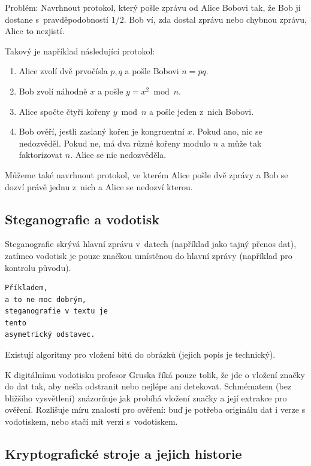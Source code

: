 Problém: Navrhnout protokol, který pošle zprávu od Alice Bobovi tak, že
Bob ji dostane s~pravděpodobností $1/2$. Bob ví, zda dostal zprávu nebo
chybnou zprávu, Alice to nezjistí.

Takový je například následující protokol:
\begin{enumerate}
    \item Alice zvolí dvě prvočísla $p,q$ a pošle Bobovi $n = pq$.
    \item Bob zvolí náhodně $x$ a pošle $y = x^2 \bmod n$.
    \item Alice spočte čtyři kořeny $y \bmod n$ a pošle jeden z~nich
        Bobovi.
    \item Bob ověří, jestli zaslaný kořen je kongruentní $x$. Pokud ano,
        nic se nedozvěděl. Pokud ne, má dva různé kořeny modulo $n$ a
        může tak faktorizovat $n$. Alice se nic nedozvěděla.
\end{enumerate}

Můžeme také navrhnout protokol, ve kterém Alice pošle dvě zprávy a Bob
se dozví právě jednu z~nich a Alice se nedozví kterou.

\pagebreak

\subsection{Steganografie a vodotisk}

Steganografie skrývá hlavní zprávu v~datech (například jako tajný přenos
dat), zatímco vodotisk je pouze
značkou umístěnou do hlavní zprávy (například pro kontrolu původu).

\begin{verbatim}
Příkladem,
a to ne moc dobrým,
steganografie v textu je
tento
asymetrický odstavec.
\end{verbatim}

Existují algoritmy pro vložení bitů do obrázků (jejich popis je
technický).

K digitálnímu vodotisku profesor Gruska říká pouze tolik, že jde o
vložení značky do dat tak, aby nešla odstranit nebo nejlépe ani
detekovat. Schmématem (bez bližšího vysvětlení) znázorňuje jak probíhá
vložení značky a její extrakce pro ověření. Rozlišuje míru znalostí pro
ověření: buď je potřeba originálu dat i verze s vodotiskem, nebo stačí
mít verzi s~vodotiskem.


\subsection{Kryptografické stroje a jejich historie}


